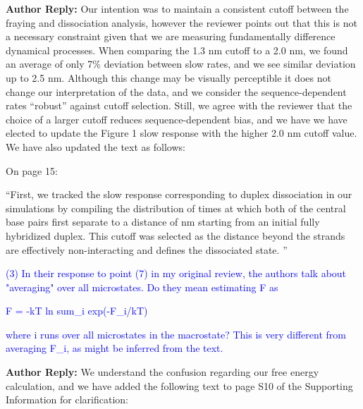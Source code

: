 \documentclass[11pt,a4paper]{letter} %
\newcommand*{\rood}[1]{{\color{red}{#1}}}
\newcommand*{\roodr}[1]{{\color{red}{#1}}}
\begin{document}
\textbf{Author Reply:} Our intention was to maintain a consistent cutoff between the fraying and dissociation analysis, however the reviewer points out that this is not a necessary constraint given that we are measuring fundamentally difference dynamical processes. When comparing the 1.3 nm cutoff to a 2.0 nm, we found an average of only 7\% deviation between slow rates, and we see similar deviation up to 2.5 nm. Although this change may be visually perceptible it does not change our interpretation of the data, and we consider the sequence-dependent rates ``robust'' against cutoff selection. Still, we agree with the reviewer that the choice of a larger cutoff reduces sequence-dependent bias, and we have we have elected to update the Figure 1 slow response with the higher 2.0 nm cutoff value. We have also updated the text as follows:

On page 15:

``First, we tracked the slow response corresponding to duplex dissociation in our simulations by compiling the distribution of times at which both of the central base pairs first separate to a distance of \roodr{2.0} nm starting from an initial fully hybridized duplex. This cutoff was selected as the distance beyond \rood{which} the strands are effectively non-interacting and defines the dissociated state. \roodr{We verified that our results were robust to choices of this cutoff over the range 1.3-2.5 nm. as measured by a <7\% average deviation in rates over that range.}''


\textcolor{blue}{
(3) In their response to point (7) in my original review, the authors talk about "averaging" over all microstates. Do they mean estimating F as
}

\textcolor{blue}{
F = -kT ln sum\_i  exp(-F\_i/kT)
}

\textcolor{blue}{
where i runs over all microstates in the macrostate? This is very different from averaging F\_i, as might be inferred from the text.
}

\textbf{Author Reply:} We understand the confusion regarding our free energy calculation, and we have added the following text to page S10 of the Supporting Information for clarification:
\end{document}
